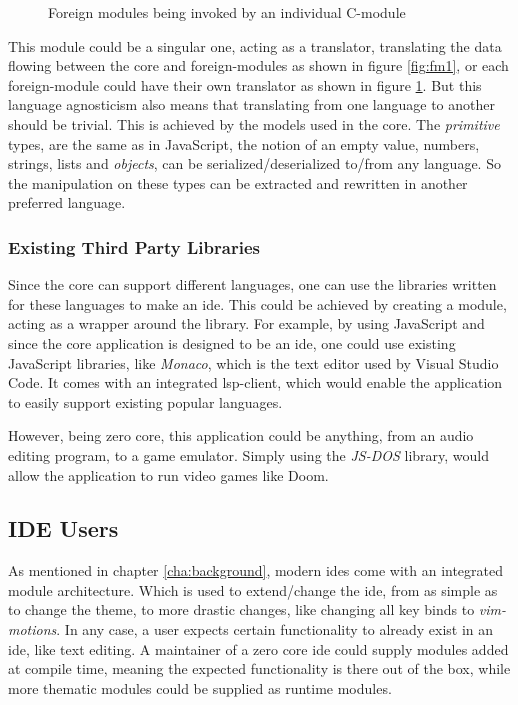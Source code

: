 \begin{figure}
  \begin{center}
    
    \caption{Foreign modules being invoked by an individual C-module}
    \label{fig:fm2}
  \end{center}
\end{figure}

This module could be a singular one, acting as a translator, translating the
data flowing between the core and foreign-modules as shown in figure
\ref{fig:fm1}, or each foreign-module could have their own translator as shown
in figure \ref{fig:fm2}. But this language agnosticism also means that
translating from one language to another should be trivial. This is achieved by
the models used in the core. The \textit{primitive} types, are the same as in
JavaScript, the notion of an empty value, numbers, strings, lists and
\textit{objects}, can be serialized/deserialized to/from any language. So the
manipulation on these types can be extracted and rewritten in another preferred
language.

\subsubsection{Existing Third Party Libraries}

Since the core can support different languages, one can use the libraries
written for these languages to make an \gls{ide}. This could be achieved by
creating a module, acting as a wrapper around the library. For example, by
using JavaScript and since the core application is designed to be an \gls{ide},
one could use existing JavaScript libraries, like \textit{Monaco}, which is the
text editor used by Visual Studio Code. It comes with an integrated
\gls{lsp}-client, which would enable the application to easily support existing
popular languages.

However, being zero core, this application could be anything, from an audio
editing program, to a game emulator. Simply using the \textit{JS-DOS} library,
would allow the application to run video games like Doom.

\subsection{IDE Users}

As mentioned in chapter \ref{cha:background}, modern \gls{ide}s come with an
integrated module architecture. Which is used to extend/change the \gls{ide},
from as simple as to change the theme, to more drastic changes, like changing
all key binds to \textit{vim-motions}. In any case, a user expects certain
functionality to already exist in an \gls{ide}, like text editing. A maintainer
of a zero core \gls{ide} could supply modules added at compile time, meaning the
expected functionality is there out of the box, while more thematic modules
could be supplied as runtime modules.


